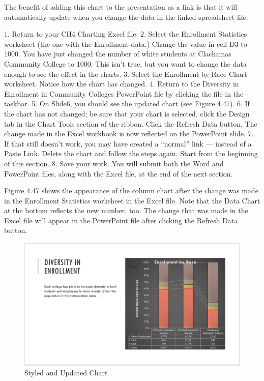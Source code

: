 The benefit of adding this chart to the presentation as a link is that it will automatically update when
you change the data in the linked spreadsheet file.

1. Return to your CH4 Charting Excel file.
2. Select the Enrollment Statistics worksheet (the one with the Enrollment data.) Change the
value in cell D3 to 1000. You have just changed the number of white students at Clackamas
Community College to 1000. This isn’t true, but you want to change the data enough to see the
effect in the charts.
3. Select the Enrollment by Race Chart worksheet. Notice how the chart has changed.
4. Return to the Diversity in Enrollment in Community Colleges PowerPoint file by clicking the
file in the taskbar.
5. On Slide6, you should see the updated chart (see Figure 4.47).
6. If the chart has not changed; be sure that your chart is selected, click the Design tab in the Chart
Tools section of the ribbon. Click the Refresh Data button. The change made in the Excel
workbook is now reflected on the PowerPoint slide.
7. If that still doesn’t work, you may have created a “normal” link — instead of a Paste Link.
Delete the chart and follow the steps again. Start from the beginning of this section.
8. Save your work. You will submit both the Word and PowerPoint files, along with the Excel file,
at the end of the next section.

Figure 4.47 shows the appearance of the column chart after the change was made in the Enrollment
Statistics worksheet in the Excel file. Note that the Data Chart at the bottom reflects the new number,
too. The change that was made in the Excel file will appear in the PowerPoint file after clicking the
Refresh Data button.



\begin{figure}[H]
	\centering
	\includegraphics[width=\maxwidth{.95\linewidth}]{gfx/ch04_fig48}
	\caption{Styled and Updated Chart}
	\label{04:fig48}
\end{figure}

